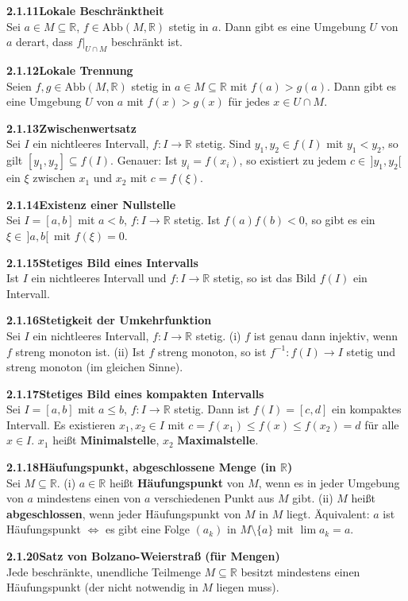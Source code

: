 \documentclass[a4paper,12pt]{article}
\newcommand{\gentry}[3]{%
  \noindent\textbf{#1\quad #2}\nopagebreak\\[0.2em]
  #3\par\smallskip
}
\begin{document}
\gentry{2.1.11}{Lokale Beschränktheit}{%
  Sei $a \in M \subseteq \mathbb{R}$, $f \in \mathrm{Abb}(M, \mathbb{R})$ stetig in $a$.
  Dann gibt es eine Umgebung $U$ von $a$ derart, dass $f|_{U \cap M}$ beschränkt ist.
}

\gentry{2.1.12}{Lokale Trennung}{%
  Seien $f, g \in \mathrm{Abb}(M, \mathbb{R})$ stetig in $a \in M \subseteq \mathbb{R}$
  mit $f(a) > g(a)$. Dann gibt es eine Umgebung $U$ von $a$ mit
  $f(x) > g(x)$ für jedes $x \in U \cap M$.
}

\gentry{2.1.13}{Zwischenwertsatz}{%
  Sei $I$ ein nichtleeres Intervall, $f: I \to \mathbb{R}$ stetig. Sind
  $y_1, y_2 \in f(I)$ mit $y_1 < y_2$, so gilt $[y_1, y_2] \subseteq f(I)$.
  Genauer: Ist $y_i = f(x_i)$, so existiert zu jedem $c \in \,]y_1, y_2[\,$ ein
  $\xi$ zwischen $x_1$ und $x_2$ mit $c = f(\xi)$.
}

\gentry{2.1.14}{Existenz einer Nullstelle}{%
  Sei $I = [a, b]$ mit $a < b$, $f: I \to \mathbb{R}$ stetig. Ist
  $f(a)f(b) < 0$, so gibt es ein $\xi \in \,]a, b[\,$ mit $f(\xi) = 0$.
}

\gentry{2.1.15}{Stetiges Bild eines Intervalls}{%
  Ist $I$ ein nichtleeres Intervall und $f: I \to \mathbb{R}$ stetig, so ist
  das Bild $f(I)$ ein Intervall.
}

\gentry{2.1.16}{Stetigkeit der Umkehrfunktion}{%
  Sei $I$ ein nichtleeres Intervall, $f: I \to \mathbb{R}$ stetig.
  (i) $f$ ist genau dann injektiv, wenn $f$ streng monoton ist.
  (ii) Ist $f$ streng monoton, so ist $f^{-1}: f(I) \to I$ stetig und
  streng monoton (im gleichen Sinne).
}

\gentry{2.1.17}{Stetiges Bild eines kompakten Intervalls}{%
  Sei $I = [a, b]$ mit $a \leq b$, $f: I \to \mathbb{R}$ stetig. Dann ist
  $f(I) = [c, d]$ ein kompaktes Intervall. Es existieren $x_1, x_2 \in I$ mit
  $c = f(x_1) \leq f(x) \leq f(x_2) = d$ für alle $x \in I$.
  $x_1$ heißt \textbf{Minimalstelle}, $x_2$ \textbf{Maximalstelle}.
}

\gentry{2.1.18}{Häufungspunkt, abgeschlossene Menge (in $\mathbb{R}$)}{%
  Sei $M \subseteq \mathbb{R}$.
  (i) $a \in \mathbb{R}$ heißt \textbf{Häufungspunkt} von $M$, wenn es in jeder
  Umgebung von $a$ mindestens einen von $a$ verschiedenen Punkt aus $M$ gibt.
  (ii) $M$ heißt \textbf{abgeschlossen}, wenn jeder Häufungspunkt von $M$ in $M$ liegt.
  Äquivalent: $a$ ist Häufungspunkt $\Leftrightarrow$ es gibt eine Folge $(a_k)$
  in $M \setminus \{a\}$ mit $\lim a_k = a$.
}

\gentry{2.1.20}{Satz von Bolzano-Weierstraß (für Mengen)}{%
  Jede beschränkte, unendliche Teilmenge $M \subseteq \mathbb{R}$ besitzt
  mindestens einen Häufungspunkt (der nicht notwendig in $M$ liegen muss).
}
\end{document}
